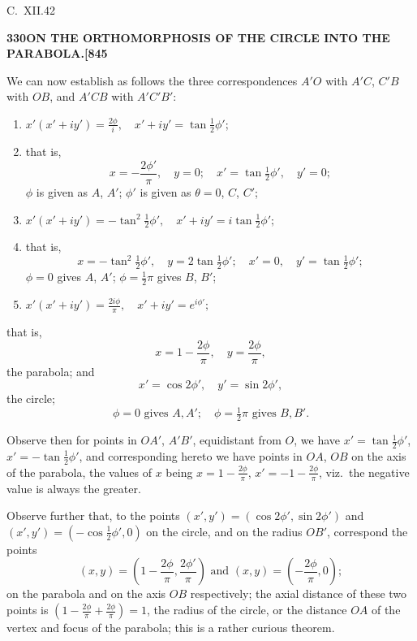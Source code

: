 \documentclass[12pt,a4paper]{article}
\theoremstyle{definition}
\begin{document}
\hfill C.\ XII.\hfill 42

\newpage
\setcounter{page}{330}

\noindent\textbf{330}\hfill\textbf{ON THE ORTHOMORPHOSIS OF THE CIRCLE INTO THE PARABOLA.}\hfill\textbf{[845}

\bigskip

\noindent We can now establish as follows the three correspondences $A'O$ with $A'C$, $C'B$ with $OB$, and $A'CB$ with $A'C'B'$:
\begin{enumerate}
\item[(1)] $x'(x' + iy') = \frac{2\phi}{i}, \quad x' + iy' = \tan\tfrac{1}{2}\phi'$;
\item[]
that is,
\[
x = -\frac{2\phi'}{\pi}, \quad y = 0; \quad x' = \tan\tfrac{1}{2}\phi', \quad y' = 0;
\]
$\phi$ is given as $A$, $A'$; $\phi'$ is given as $\theta = 0$, $C$, $C'$;
\item[(2)] $x'(x' + iy') = -\tan^2\tfrac{1}{2}\phi', \quad x' + iy' = i\tan\tfrac{1}{2}\phi';$
\item[]
that is,
\[
x = -\tan^2\tfrac{1}{2}\phi', \quad y = 2\tan\tfrac{1}{2}\phi'; \quad x' = 0, \quad y' = \tan\tfrac{1}{2}\phi';
\]
$\phi = 0$ gives $A$, $A'$; $\phi = \tfrac{1}{2}\pi$ gives $B$, $B'$;
\item[(3)] $x'(x' + iy') = \frac{2i\phi}{\pi}, \quad x' + iy' = e^{i\phi'};$
\end{enumerate}
that is,
\[
x = 1 - \frac{2\phi}{\pi}, \quad y = \frac{2\phi}{\pi},
\]
the parabola; and
\[
x' = \cos 2\phi', \quad y' = \sin 2\phi',
\]
the circle;
\[
\phi = 0 \text{ gives } A, A'; \quad \phi = \tfrac{1}{2}\pi \text{ gives } B, B'.
\]

Observe then for points in $OA'$, $A'B'$, equidistant from $O$, we have $x' = \tan\tfrac{1}{2}\phi'$, $x' = -\tan\tfrac{1}{2}\phi'$, and corresponding hereto we have points in $OA$, $OB$ on the axis of the parabola, the values of $x$ being $x = 1 - \frac{2\phi}{\pi}$, $x' = -1 - \frac{2\phi}{\pi}$, viz.\ the negative value is always the greater.

Observe further that, to the points $(x', y') = (\cos 2\phi', \sin 2\phi')$ and $(x', y') = (-\cos\tfrac{1}{2}\phi', 0)$ on the circle, and on the radius $OB'$, correspond the points
\[
(x, y) = \left(1 - \frac{2\phi}{\pi}, \frac{2\phi'}{\pi}\right) \text{ and } (x, y) = \left(-\frac{2\phi}{\pi}, 0\right);
\]
on the parabola and on the axis $OB$ respectively; the axial distance of these two points is $\left(1 - \frac{2\phi}{\pi} + \frac{2\phi}{\pi}\right) = 1$, the radius of the circle, or the distance $OA$ of the vertex and focus of the parabola; this is a rather curious theorem.
\end{document}
